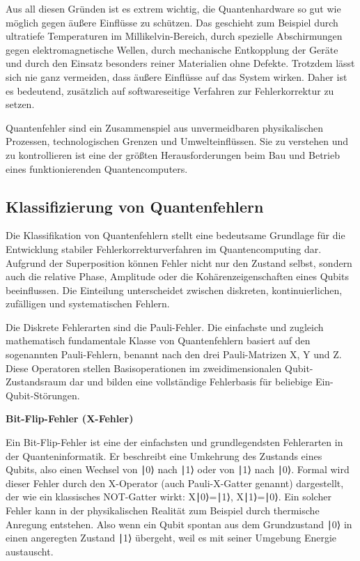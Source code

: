 Aus all diesen Gründen ist es extrem wichtig, die Quantenhardware so gut wie möglich gegen äußere Einflüsse zu schützen. Das geschieht zum Beispiel durch ultratiefe Temperaturen im Millikelvin-Bereich, durch spezielle Abschirmungen gegen elektromagnetische Wellen, durch mechanische Entkopplung der Geräte und durch den Einsatz besonders reiner Materialien ohne Defekte. Trotzdem lässt sich nie ganz vermeiden, dass äußere Einflüsse auf das System wirken. Daher ist es bedeutend, zusätzlich auf softwareseitige Verfahren zur Fehlerkorrektur zu setzen. \cite[Seite 24-26]{tutschku_quantencomputing_2023}

Quantenfehler sind ein Zusammenspiel aus unvermeidbaren physikalischen Prozessen, technologischen Grenzen und Umwelteinflüssen. Sie zu verstehen und zu kontrollieren ist eine der größten Herausforderungen beim Bau und Betrieb eines funktionierenden Quantencomputers.

\subsection{Klassifizierung von Quantenfehlern}\label{chap:QEC1.3}
Die Klassifikation von Quantenfehlern stellt eine bedeutsame Grundlage für die Entwicklung stabiler Fehlerkorrekturverfahren im Quantencomputing dar. Aufgrund der Superposition können Fehler nicht nur den Zustand selbst, sondern auch die relative Phase, Amplitude oder die Kohärenzeigenschaften eines Qubits beeinflussen. Die Einteilung unterscheidet zwischen diskreten, kontinuierlichen, zufälligen und systematischen Fehlern.

Die Diskrete Fehlerarten sind die Pauli-Fehler. Die einfachste und zugleich mathematisch fundamentale Klasse von Quantenfehlern basiert auf den sogenannten Pauli-Fehlern, benannt nach den drei Pauli-Matrizen 
X, Y und Z. Diese Operatoren stellen Basisoperationen im zweidimensionalen Qubit-Zustandsraum dar und bilden eine vollständige Fehlerbasis für beliebige Ein-Qubit-Störungen.


\textbf{Bit-Flip-Fehler (X-Fehler)}

Ein Bit-Flip-Fehler ist eine der einfachsten und grundlegendsten Fehlerarten in der Quanteninformatik. Er beschreibt eine Umkehrung des Zustands eines Qubits, also einen Wechsel von ∣0⟩ nach ∣1⟩ oder von ∣1⟩ nach ∣0⟩. Formal wird dieser Fehler durch den X-Operator (auch Pauli-X-Gatter genannt) dargestellt, der wie ein klassisches NOT-Gatter wirkt: X∣0⟩=∣1⟩, X∣1⟩=∣0⟩. Ein solcher Fehler kann in der physikalischen Realität zum Beispiel durch thermische Anregung entstehen. Also wenn ein Qubit spontan aus dem Grundzustand ∣0⟩ in einen angeregten Zustand ∣1⟩ übergeht, weil es mit seiner Umgebung Energie austauscht.


